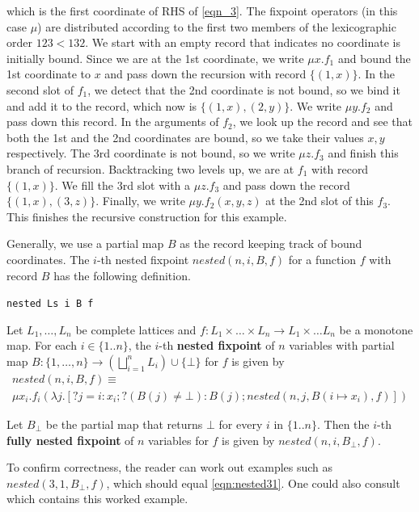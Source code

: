 which is the first coordinate of RHS of \autoref{eqn_3}. The fixpoint operators (in this case $\mu$) are distributed according to the first two members of the lexicographic order $123 < 132$. We start with an empty record that indicates no coordinate is initially bound. Since we are at the 1st coordinate, we write $\mu x. f_1$ and bound the 1st coordinate to $x$ and pass down the recursion with record $\{(1,x)\}$. In the second slot of $f_1$, we detect that the 2nd coordinate is not bound, so we bind it and add it to the record, which now is $\{(1,x),(2,y)\}$. We write $\mu y. f_2$ and pass down this record. In the arguments of $f_2$, we look up the record and see that both the 1st and the 2nd coordinates are bound, so we take their values $x,y$ respectively. The 3rd coordinate is not bound, so we write $\mu z. f_3$ and finish this branch of recursion. Backtracking two levels up, we are at $f_1$ with record $\{(1,x)\}$. We fill the 3rd slot with a $\mu z. f_3$ and pass down the record $\{(1,x), (3,z)\}$. Finally, we write $\mu y. f_2(x,y,z)$ at the 2nd slot of this $f_3$. This finishes the recursive construction for this example.

Generally, we use a partial map $B$ as the record keeping track of bound coordinates. The $i$-th nested fixpoint $nested(n,i,B,f)$ for a function $f$ with record $B$ has the following definition.

\begin{bdefinition}
\texttt{nested\ Ls\ i\ B\ f}
\label{def:nested}
    
    Let $L_1,\dots,L_n$ be complete lattices and $f:L_1\times \dots \times L_n\rightarrow L_1\times\dots L_n$ be a monotone map. For each $i\in\{1..n\}$, the $i$-th \textbf{nested fixpoint} of $n$ variables with partial map $B:\{1,\dots,n\}\rightarrow (\bigsqcup_{i=1}^n L_i)\cup \{\bot\}$ for $f$ is given by
    \begin{multline}
    \label{eqn:nested}
        nested(n,i,B,f) \equiv \\
        \mu x_i.f_i(\lambda j. [?j=i:x_i;?(B(j)\neq \bot): B(j); nested(n,j,B(i\mapsto x_i), f)])
    \end{multline}

    Let $B_\bot$ be the partial map that returns $\bot$ for every $i$ in $\{1..n\}$. Then the $i$-th \textbf{fully nested fixpoint} of $n$ variables for $f$ is given by $nested (n,i,B_\bot,f)$.
\end{bdefinition}

To confirm correctness, the reader can work out examples such as $nested(3,1,B_\bot,f)$, which should equal \autoref{eqn:nested31}. One could also consult \cite{xu2025} which contains this worked example.

